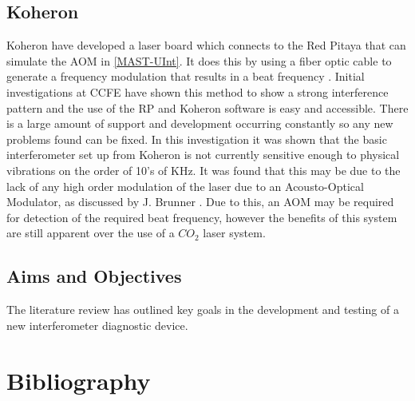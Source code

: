 \documentclass[12pt,a4paper,oneside]{report}
\begin{document}
\section{Koheron}
Koheron have developed a laser board which connects to the Red Pitaya that can simulate the AOM in \autoref{MAST-UInt}. It does this by using a fiber optic cable to generate a frequency modulation that results in a beat frequency \cite{KoheronAmplitudeKoheron}. Initial investigations at CCFE \cite{Hickling2017InvestigationMAST-U} have shown this method to show a strong interference pattern and the use of the RP and Koheron software is easy and accessible. There is a large amount of support and development occurring constantly so any new problems found can be fixed. In this investigation it was shown that the basic interferometer set up from Koheron is not currently sensitive enough to physical vibrations on the order of 10's of KHz. It was found that this may be due to the lack of any high order modulation of the laser due to an Acousto-Optical Modulator, as discussed by J. Brunner \cite[p. ~29]{Brunner2017}. Due to this, an AOM may be required for detection of the required beat frequency, however the benefits of this system are still apparent over the use of a $CO_{2}$ laser system.

	\section{Aims and Objectives}
The literature review has outlined key goals in the development and testing of a new interferometer diagnostic device.

\pagebreak
\chapter{Bibliography}
	\printbibliography[heading=none]

\pagebreak


\setcounter{page}{2}
\begin{appendices}

%
\end{appendices}
\end{document}
